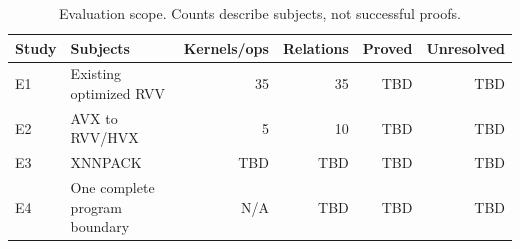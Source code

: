 \begin{table}[htbp]
\centering
\small
\caption{Evaluation scope. Counts describe subjects, not successful proofs.}
\label{tab:scope}
\begin{tabular}{@{}llrrrr@{}}
\toprule
Study & Subjects & Kernels/ops & Relations & Proved & Unresolved \\
\midrule
E1 & Existing optimized RVV & 35 & 35 & TBD & TBD \\
E2 & AVX to RVV/HVX & 5 & 10 & TBD & TBD \\
E3 & XNNPACK & TBD & TBD & TBD & TBD \\
E4 & One complete program boundary & N/A & TBD & TBD & TBD \\
\bottomrule
\end{tabular}
\end{table}
